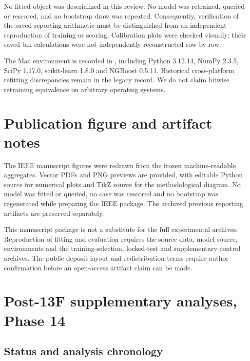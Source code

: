 No fitted object was deserialized in this review. No model was retrained, queried or rescored, and no bootstrap draw was repeated. Consequently, verification of the saved reporting arithmetic must be distinguished from an independent reproduction of training or scoring. Calibration plots were checked visually; their saved bin calculations were not independently reconstructed row by row.

The Mac environment is recorded in , including Python 3.12.14, NumPy 2.3.5, SciPy 1.17.0, scikit-learn 1.8.0 and NGBoost 0.5.11. Historical cross-platform refitting discrepancies remain in the legacy record. We do not claim bitwise retraining equivalence on arbitrary operating systems.

\hypertarget{publication-figure-and-artifact-notes}{%
\section{Publication figure and artifact notes}\label{publication-figure-and-artifact-notes}}

The IEEE manuscript figures were redrawn from the frozen machine-readable aggregates. Vector PDFs and PNG previews are provided, with editable Python source for numerical plots and TikZ source for the methodological diagram. No model was fitted or queried, no case was rescored and no bootstrap was regenerated while preparing the IEEE package. The archived previous reporting artifacts are preserved separately.

This manuscript package is not a substitute for the full experimental archives. Reproduction of fitting and evaluation requires the source data, model source, environments and the training-selection, locked-test and supplementary-control archives. The public deposit layout and redistribution terms require author confirmation before an open-access artifact claim can be made.

\hypertarget{post-13f-supplementary-analyses-phase-14}{%
\section{Post-13F supplementary analyses, Phase 14}\label{post-13f-supplementary-analyses-phase-14}}

\hypertarget{status-and-analysis-chronology}{%
\subsection{Status and analysis chronology}\label{status-and-analysis-chronology}}

